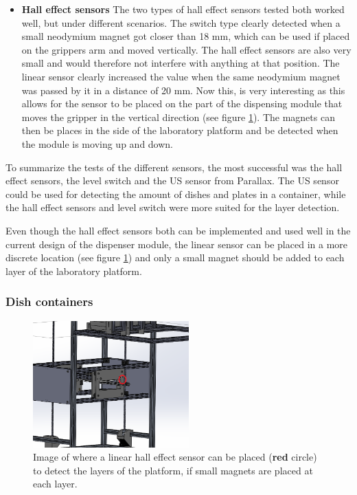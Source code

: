 \documentclass[10pt,a4paper]{article}
\begin{document}
\begin{itemize}
			\item \textbf{Hall effect sensors} The two types of hall effect sensors tested both worked well, but under different scenarios. The switch type clearly detected when a small neodymium magnet got closer than 18 mm, which can be used if placed on the grippers arm and moved vertically. The hall effect sensors are also very small and would therefore not interfere with anything at that position. The linear sensor clearly increased the value when the same neodymium magnet was passed by it in a distance of 20 mm. Now this, is very interesting as this allows for the sensor to be placed on the part of the dispensing module that moves the gripper in the vertical direction (see figure \ref{fig::layerDetectionPosition}). The magnets can then be places in the side of the laboratory platform and be detected when the module is moving up and down.
			
		\end{itemize}
		
		To summarize the tests of the different sensors, the most successful was the hall effect sensors, the level switch and the US sensor from Parallax. The US sensor could be used for detecting the amount of dishes and plates in a container, while the hall effect sensors and level switch were more suited for the layer detection.
		
		Even though the hall effect sensors both can be implemented and used well in the current design of the dispenser module, the linear sensor can be placed in a more discrete location (see figure \ref{fig::layerDetectionPosition}) and only a small magnet should be added to each layer of the laboratory platform.
				
		\subsubsection{Dish containers}	
		
		
		\begin{figure}
					\includegraphics[width=6cm]{images/layerDetectionPosition.png}
					\caption{Image of where a linear hall effect sensor can be placed ({\color{red}\textbf{red}} circle) to detect the layers of the platform, if small magnets are placed at each layer.}
					\label{fig::layerDetectionPosition}
				\end{figure}
	
\end{document}
